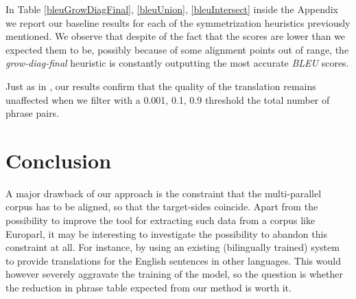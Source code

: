 \documentclass[11pt]{article}
\begin{document}


In Table \ref{bleuGrowDiagFinal}, \ref{bleuUnion}, \ref{bleuIntersect} inside the Appendix we report our baseline results for each of the symmetrization heuristics previously mentioned. We observe that despite of the fact that the scores are lower than we expected them to be, possibly because of some alignment points out of range, the \textit{grow-diag-final} heuristic is constantly outputting the most accurate \textit{BLEU} scores.

 Just as in \cite{Johnson}, our results confirm that the quality of the translation remains unaffected when we filter with a 0.001, 0.1, 0.9 threshold the total number of phrase pairs. 







\section{Conclusion}

A major drawback of our approach is the constraint that the multi-parallel corpus has to be aligned, so that the target-sides coincide. Apart from the possibility to improve the tool for extracting such data from a corpus like Europarl, it may be interesting to investigate the possibility to abandon this constraint at all. For instance, by using an existing (bilingually trained) system to provide translations for the English sentences in other languages. This would however severely aggravate the training of the model, so the question is whether the reduction in phrase table expected from our method is worth it.
\end{document}

